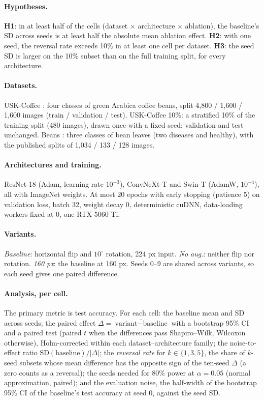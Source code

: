 \documentclass[10pt]{article}
\begin{document}
\paragraph{Hypotheses.}
\textbf{H1}: in at least half of the cells (dataset $\times$ architecture
$\times$ ablation), the baseline's SD across seeds is at least half the absolute
mean ablation effect. \textbf{H2}: with one seed, the reversal rate exceeds 10\%
in at least one cell per dataset. \textbf{H3}: the seed SD is larger on the 10\%
subset than on the full training split, for every architecture.

\paragraph{Datasets.} USK-Coffee \citep{febriana2022usk}: four classes of green
Arabica coffee beans, split 4,800 / 1,600 / 1,600 images (train / validation /
test). USK-Coffee 10\%: a stratified 10\% of the training split (480 images),
drawn once with a fixed seed; validation and test unchanged. Beans
\citep{makerere2020beans}: three classes of bean leaves (two diseases and
healthy), with the published splits of 1,034 / 133 / 128 images.

\paragraph{Architectures and training.} ResNet-18 \citep{he2016resnet} (Adam,
learning rate $10^{-3}$), ConvNeXt-T \citep{liu2022convnext} and Swin-T
\citep{liu2021swin} (AdamW, $10^{-4}$), all with ImageNet weights. At most 20
epochs with early stopping (patience 5) on validation loss, batch 32, weight
decay 0, deterministic cuDNN, data-loading workers fixed at 0, one RTX 5060 Ti.

\paragraph{Variants.} \emph{Baseline}: horizontal flip and $10^\circ$ rotation,
224 px input. \emph{No aug.}: neither flip nor rotation. \emph{160 px}: the
baseline at 160 px. Seeds 0--9 are shared across variants, so each seed gives
one paired difference.

\paragraph{Analysis, per cell.} The primary metric is test accuracy. For each
cell: the baseline mean and SD across seeds; the paired effect
$\Delta = \overline{\text{variant} - \text{baseline}}$ with a bootstrap 95\% CI
and a paired test (paired $t$ when the differences pass Shapiro--Wilk, Wilcoxon
otherwise), Holm-corrected within each dataset--architecture family;
the noise-to-effect ratio $\mathrm{SD}(\text{baseline})/|\Delta|$; the
\emph{reversal rate} for $k \in \{1,3,5\}$, the share of $k$-seed subsets whose
mean difference has the opposite sign of the ten-seed $\Delta$ (a zero counts as
a reversal); the seeds needed for 80\% power at $\alpha=0.05$ (normal
approximation, paired); and the evaluation noise, the half-width of the
bootstrap 95\% CI of the baseline's test accuracy at seed 0, against the seed SD.
\end{document}
